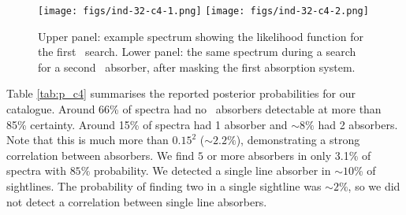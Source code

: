 \documentclass[fleqn,usenatbib]{mnras}
\newcommand{\civ}{\ion{C}{IV}}
\newcommand{\nciv}{N_{\civ}} %
\newcommand{\zciv}{z_{\civ}}
\newcommand{\sciv}{\sigma_{\civ}}
\newcommand{\kms}{kms$^{-1}$} %
\newcommand{\zqso}{z_{\textrm{QSO}}}
\newcommand{\model}{\mathcal{M}}
\begin{document}

\begin{figure*}
  \texttt{[image: figs/ind-32-c4-1.png]}
  \texttt{[image: figs/ind-32-c4-2.png]}
  \caption{Upper panel: example spectrum showing the likelihood function for the first
   \civ~search. Lower panel: the same spectrum during a search for a
   second \civ~absorber, after masking the first absorption system.
    }
  \label{fig:search12}
\end{figure*}

Table \ref{tab:p_c4} summarises the reported posterior probabilities for our catalogue.
Around 66\% of spectra had no \civ\ absorbers detectable at more than 85\% certainty.
 Around 15\% of spectra had 1 absorber and $\sim 8\%$ had 2 absorbers.
  Note that this is much more than $0.15^2$ ($\sim 2.2\%$), demonstrating a
  strong correlation between absorbers. We find $5$ or more absorbers in only 3.1\% of spectra
  with $85\%$ probability. We detected a single line absorber in $\sim 10$\% of sightlines. The probability of finding two in a single sightline was $\sim 2\%$, so we did not detect a correlation between single line absorbers.

\end{document}
